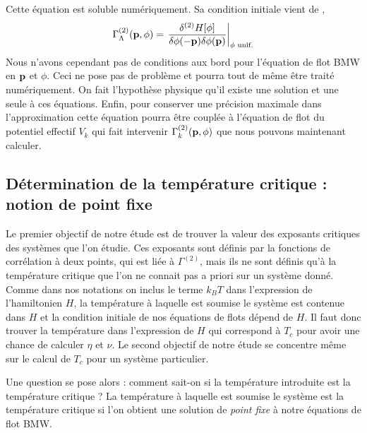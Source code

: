 \documentclass[10.5pt]{article}
\begin{document}
\begin{multicols*}{2}
Cette équation est soluble numériquement. Sa condition initiale vient de ,  
\begin{equation}
	\Gamma^{(2)}_\Lambda({\bf p}, \phi) = \left. \frac{\delta ^{(2)}H[\phi]}{\delta \phi(-{\bf p})\delta\phi({\bf p})} \right|_{\phi \text{ unif.}}
	\label{eq:initBMW}
\end{equation}
Nous n'avons cependant pas de conditions aux bord pour l'équation de flot BMW en ${\bf p}$ et $\phi$. Ceci ne pose pas de problème et pourra tout de même être traité numériquement. On fait l'hypothèse physique qu'il existe une solution et une seule à ces équations. Enfin, pour conserver une précision maximale dans l'approximation cette équation pourra être couplée à l'équation de flot du potentiel effectif $V_k$ qui fait intervenir $\Gamma_k^{(2)}({\bf p}, \phi)$ que nous pouvons maintenant calculer.



\vspace*{11pt}
\subsection{Détermination de la température critique : notion de point fixe}

Le premier objectif de notre étude est de trouver la valeur des exposants critiques des systèmes que l'on étudie. Ces exposants sont définis par la fonctions de corrélation à deux points, qui est liée à $\Gamma^{(2)}$, mais ils ne sont définis qu'à la température critique que l'on ne connait pas a priori sur un système donné. Comme dans nos notations on inclus le terme $k_BT$ dans l'expression de l'hamiltonien $H$, la température à laquelle est soumise le système est contenue dans $H$ et la condition initiale de nos équations de flots dépend de $H$. Il faut donc trouver la température dans l'expression de $H$ qui correspond à $T_c$ pour avoir une chance de calculer $\eta$ et $\nu$. Le second objectif de notre étude se concentre même sur le calcul de $T_c$ pour un système particulier. 

Une question se pose alors : comment sait-on si la température introduite est la température critique ? La température à laquelle est soumise le système est la température critique si l'on obtient une solution de \textit{point fixe} à notre équations de flot BMW. \\


\end{multicols*}
\end{document}
